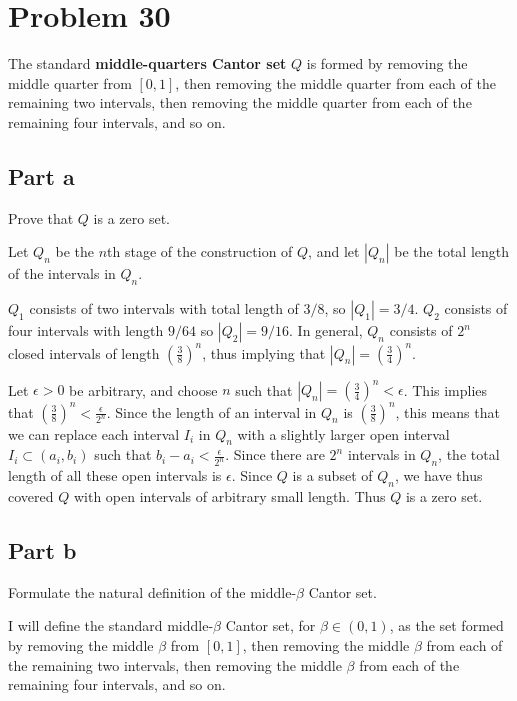 \documentclass{article}
\begin{document}
\section*{Problem 30}

The standard \textbf{middle-quarters Cantor set} $Q$ is formed by removing the middle quarter from $[0, 1]$, then removing the middle quarter from each of the remaining two intervals, then removing the middle quarter from each of the remaining four intervals, and so on.

\subsection*{Part a}

Prove that $Q$ is a zero set.

Let $Q_n$ be the $n$th stage of the construction of $Q$, and let $|Q_n|$ be the total length of the intervals in $Q_n$.

$Q_1$ consists of two intervals with total length of $3/8$, so $|Q_1| = 3/4$. $Q_2$ consists of four intervals with length $9/64$ so $|Q_2| = 9/16$. In general, $Q_n$ consists of $2^n$ closed intervals of length $(\frac{3}{8})^n$, thus implying that $|Q_n| = (\frac{3}{4})^n$.

Let $\epsilon > 0$ be arbitrary, and choose $n$ such that $|Q_n| = (\frac{3}{4})^n < \epsilon$. This implies that $(\frac{3}{8})^n < \frac{\epsilon}{2^n}$. Since the length of an interval in $Q_n$ is $(\frac{3}{8})^n$, this means that we can replace each interval $I_i$ in $Q_n$ with a slightly larger open interval $I_i \subset(a_i, b_i)$ such that $b_i - a_i < \frac{\epsilon}{2^n}$. Since there are $2^n$ intervals in $Q_n$, the total length of all these open intervals is $\epsilon$. Since $Q$ is a subset of $Q_n$, we have thus covered $Q$ with open intervals of arbitrary small length. Thus $Q$ is a zero set.

\subsection*{Part b}

Formulate the natural definition of the middle-$\beta$ Cantor set.

I will define the standard middle-$\beta$ Cantor set, for $\beta \in (0, 1)$, as the set formed by removing the middle $\beta$ from $[0, 1]$, then removing the middle $\beta$ from each of the remaining two intervals, then removing the middle $\beta$ from each of the remaining four intervals, and so on.
\end{document}
